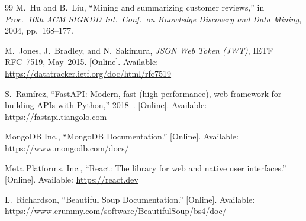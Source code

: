 \documentclass[10pt, journal, twocolumn]{IEEEtran}
\begin{document}
\begin{thebibliography}{99}
M.~Hu and B.~Liu, ``Mining and summarizing customer reviews,'' in \emph{Proc.\ 10th ACM SIGKDD Int.\ Conf.\ on Knowledge Discovery and Data Mining}, 2004, pp.~168--177.

M.~Jones, J.~Bradley, and N.~Sakimura, \emph{JSON Web Token (JWT)}, IETF RFC~7519, May~2015. [Online]. Available: \url{https://datatracker.ietf.org/doc/html/rfc7519}

S.~Ram\'{i}rez, ``FastAPI: Modern, fast (high-performance), web framework for building APIs with Python,'' 2018--. [Online]. Available: \url{https://fastapi.tiangolo.com}

MongoDB Inc., ``MongoDB Documentation.'' [Online]. Available: \url{https://www.mongodb.com/docs/}

Meta Platforms, Inc., ``React: The library for web and native user interfaces.'' [Online]. Available: \url{https://react.dev}

L.~Richardson, ``Beautiful Soup Documentation.'' [Online]. Available: \url{https://www.crummy.com/software/BeautifulSoup/bs4/doc/}

\end{thebibliography}
\end{document}
